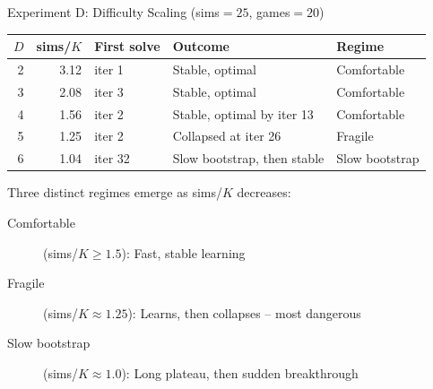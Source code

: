 \documentclass[aspectratio=169, 10pt]{beamer}
\begin{document}
\begin{frame}{Experiment D: Difficulty Scaling (sims$=25$, games$=20$)}

\centering
\begin{tabular}{rrlll}
\toprule
$D$ & sims/$K$ & First solve & Outcome & Regime \\
\midrule
2 & 3.12 & iter 1  & \textcolor{success}{Stable, optimal}   & \textcolor{success}{Comfortable} \\
3 & 2.08 & iter 3  & \textcolor{success}{Stable, optimal}   & \textcolor{success}{Comfortable} \\
4 & 1.56 & iter 2  & \textcolor{success}{Stable, optimal by iter 13} & \textcolor{success}{Comfortable} \\
5 & 1.25 & iter 2  & \textcolor{fragile}{Collapsed at iter 26} & \textcolor{fragile}{Fragile} \\
6 & 1.04 & iter 32 & \textcolor{azblue}{Slow bootstrap, then stable} & \textcolor{azblue}{Slow bootstrap} \\
\bottomrule
\end{tabular}

\vspace{0.5cm}
Three distinct regimes emerge as sims/$K$ decreases:

\vspace{0.2cm}
\begin{description}
  \item[\textcolor{success}{Comfortable}] (sims/$K \geq 1.5$): Fast, stable learning
  \item[\textcolor{fragile}{Fragile}] (sims/$K \approx 1.25$): Learns, then collapses -- \alert{most dangerous}
  \item[\textcolor{azblue}{Slow bootstrap}] (sims/$K \approx 1.0$): Long plateau, then sudden breakthrough
\end{description}
\end{frame}
\end{document}
